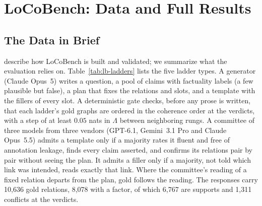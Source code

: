 \section{LoCoBench: Data and Full Results}
\label{sec-full-locobench}
\label{app:results}

\subsection{The Data in Brief}

\citet{anonlocobench} describe how LoCoBench is built and validated; we summarize what the
evaluation relies on. Table~\ref{tab:lb-ladders} lists the five ladder types. A generator (Claude
Opus~5) writes a question, a pool of claims with factuality labels (a few plausible but false), a
plan that fixes the relations and slots, and a template with the fillers of every slot. A
deterministic gate checks, before any prose is written, that each ladder's gold graphs are ordered
in the coherence order at the verdicts, with a step of at least $0.05$ nats in $\Lambda$ between
neighboring rungs. A committee of three models from three vendors (GPT-6.1, Gemini~3.1 Pro and
Claude Opus~5.5) admits a template only if a majority rates it fluent and free of annotation
leakage, finds every claim asserted, and confirms its relations pair by pair without seeing the
plan. It admits a filler only if a majority, not told which link was intended, reads exactly that
link. Where the committee's reading of a fixed relation departs from the plan, gold follows the
reading. The \sThreeItems{} responses carry 10,636 gold relations, 8,078 with a factor, of which
6,767 are supports and 1,311 conflicts at the verdicts.


